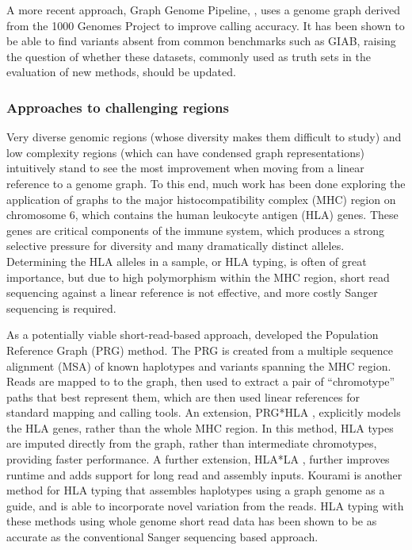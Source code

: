 A more recent approach, Graph Genome Pipeline, \cite{Rakocevic_2019}, uses a genome graph derived from the 1000 Genomes Project to improve calling accuracy.
It has been shown to be able to find variants absent from common benchmarks such as GIAB, raising the question of whether these datasets, commonly used as truth sets in the evaluation of new methods, should be updated.

\subsubsection{Approaches to challenging regions}

Very diverse genomic regions (whose diversity makes them difficult to study) and low complexity regions (which can have condensed graph representations) intuitively stand to see the most improvement when moving from a linear reference to a genome graph.
To this end, much work has been done exploring the application of graphs to the major histocompatibility complex (MHC) region on chromosome 6, which contains the human leukocyte antigen (HLA) genes.
These genes are critical components of the immune system, which produces a strong selective pressure for diversity and many dramatically distinct alleles.
Determining the HLA alleles in a sample, or HLA typing, is often of great importance, but due to high polymorphism within the MHC region, short read sequencing against a linear reference is not effective, and more costly Sanger sequencing is required.

As a potentially viable short-read-based approach, \citeauthor{dilthey2015improved} developed the Population Reference Graph (PRG) method.
The PRG is created from a multiple sequence alignment (MSA) of known haplotypes and variants spanning the MHC region.
Reads are mapped to to the graph, then used to extract a pair of ``chromotype'' paths that best represent them, which are then used linear references for standard mapping and calling tools.
An extension, PRG*HLA \cite{dilthey2018hla}, explicitly models the HLA genes, rather than the whole MHC region.
In this method, HLA types are imputed directly from the graph, rather than intermediate chromotypes, providing faster performance.
A further extension, HLA*LA \cite{dilthey2019hla}, further improves runtime and adds support for long read and assembly inputs.
Kourami \cite{lee2018kourami} is another method for HLA typing that assembles haplotypes using a graph genome as a guide, and is able to incorporate novel variation from the reads.
HLA typing with these methods using whole genome short read data has been shown to be as accurate as the conventional Sanger sequencing based approach.

